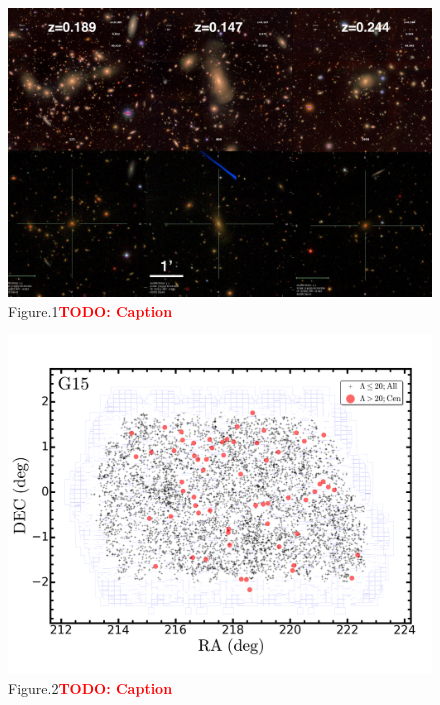 \documentclass[preprint]{aastex}
\newcommand{\todo}[1]{\textcolor{red}{\textbf{TODO: #1}}}
\begin{document}
\begin{CJK*}{UTF8}{gbsn}

\clearpage
{}
\begin{figure}
    \centering 
    \includegraphics[width=15.5cm]{fig/fig1.png}
    \caption{Figure.1\todo{Caption}}
    \label{figure:1}
\end{figure}

\clearpage
{}
\begin{figure}
    \centering 
    \includegraphics[width=13.5cm]{fig/massive_s15b_g15_sample.png}
    \caption{Figure.2\todo{Caption}}
    \label{figure:2}
\end{figure}


\end{CJK*}
\end{document}
